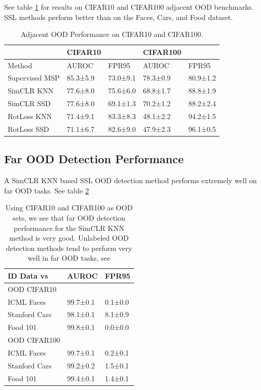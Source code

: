 \documentclass{article} %
\theoremstyle{plain}
\theoremstyle{definition}
\theoremstyle{remark}
\begin{document}
See table \ref{c10} for results on CIFAR10 and CIFAR100 adjacent OOD benchmarks. SSL methods perform better than on the Faces, Cars, and Food dataset. 

\label{c10tables}




\begin{table}[!h]
\centering
\begin{tabular}{|l|ll|ll|}
\hline
               & CIFAR10  &          & CIFAR100 &          \\ \hline
Method         & AUROC    & FPR95    & AUROC    & FPR95    \\ \hline
Supervised MSP & 85.3±5.9 & 73.0±9.1 & 78.3±0.9 & 80.9±1.2 \\
SimCLR KNN     & 77.6±8.0 & 75.6±6.0 & 68.8±1.7 & 88.8±1.9 \\
SimCLR SSD     & 77.6±8.0 & 69.1±1.3 & 70.2±1.2 & 88.2±2.4 \\
RotLoss KNN    & 71.4±9.1 & 83.3±8.3 & 48.1±2.2 & 94.2±1.5 \\
RotLoss SSD    & 71.1±6.7 & 82.6±9.0 & 47.9±2.3 & 96.1±0.5 \\ \hline
\end{tabular}
\caption{Adjacent OOD Performance on CIFAR10 and CIFAR100.}
\label{c10}
\end{table}

\subsection{Far OOD Detection Performance}

A SimCLR KNN based SSL OOD detection method performs extremely well on far OOD tasks. See table \ref{fartable}

\label{far}

\begin{table}[!ht]
    \centering
    \begin{tabular}{|l|l|l|}
    \hline
        ID Data vs & AUROC & FPR95 \\ \hline
        OOD CIFAR10 &  &  \\ 
        \hline
        ICML Faces & 99.7±0.1 & 0.1±0.0 \\ \hline
        Stanford Cars & 98.1±0.1 & 8.1±0.9 \\ \hline
        Food 101 & 99.8±0.1 & 0.0±0.0 \\ \hline
        OOD CIFAR100 & ~ & ~ \\ \hline
        ICML Faces & 99.7±0.1 & 0.2±0.1 \\ \hline
        Stanford Cars & 99.2±0.2 & 1.5±0.1 \\ \hline
        Food 101 & 99.4±0.1 & 1.4±0.1 \\ \hline
    \end{tabular}
    \caption{Using CIFAR10 and CIFAR100 as OOD sets, we see that far OOD detection performance for the SimCLR KNN method is very good. Unlabeled OOD detection methods tend to perform very well in far OOD tasks, see  \citep{sehwag2021ssd, tack2020csi, liu2023unsupervised, guille2024cadet, wang2023clipn}}
    \label{fartable}
\end{table}
\end{document}
